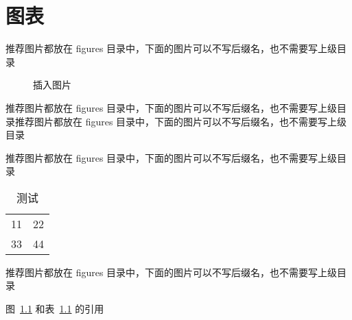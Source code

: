 
\chapter{图表}

推荐图片都放在 figures 目录中，下面的图片可以不写后缀名，也不需要写上级目录
\begin{figure}[htbp]
  \centering
  \caption{插入图片}
  \label{figure:test1}
\end{figure}
推荐图片都放在 figures 目录中，下面的图片可以不写后缀名，也不需要写上级目录推荐图片都放在 figures 目录中，下面的图片可以不写后缀名，也不需要写上级目录

推荐图片都放在 figures 目录中，下面的图片可以不写后缀名，也不需要写上级目录
\begin{table}[htbp]
  \centering
  \caption{测试}
  \label{table:test1}
  \begin{tabular}{|c|c|}
    11 & 22 \\
    33 & 44 
  \end{tabular}
\end{table}
推荐图片都放在 figures 目录中，下面的图片可以不写后缀名，也不需要写上级目录


图~\ref{figure:test1} 和表~\ref{table:test1} 的引用